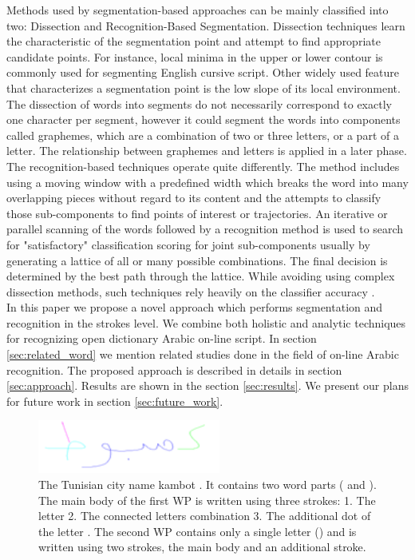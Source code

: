 \documentclass[journal,compsoc]{IEEEtran}
\begin{document}
Methods used by segmentation-based approaches can be mainly classified into two: Dissection and Recognition-Based Segmentation. Dissection techniques learn the characteristic of the segmentation point and attempt to find appropriate candidate points. For instance, local minima in the upper or lower contour is commonly used for segmenting English cursive script. Other widely used feature that characterizes a segmentation point is the low slope of its local environment. The dissection of words into segments do not necessarily correspond to exactly one character per segment, however it could segment the words into components called graphemes, which are a combination of two or three letters, or a part of a letter. The relationship between graphemes and letters is applied in a later phase. The recognition-based techniques operate quite differently. The method includes using a moving window with a predefined width which breaks the word into many overlapping pieces without regard to its content and the attempts to classify those sub-components to find points of interest or trajectories. An iterative or parallel scanning of the words followed by a recognition method is used to search for "satisfactory" classification scoring for joint sub-components usually by generating a lattice of all or many possible combinations. The final decision is determined by the best path through the lattice. While avoiding using complex dissection methods, such techniques rely heavily on the classifier accuracy \cite{casey1996survey}. \\

In this paper we propose a novel approach which performs segmentation and recognition in the strokes level. We combine both holistic and analytic techniques for recognizing open dictionary Arabic on-line script. In section \ref{sec:related_word} we mention related studies done in the field of on-line Arabic recognition. The proposed approach is described in details in section \ref{sec:approach}. Results are shown in the section \ref{sec:results}. We present our plans for future work in section \ref{sec:future_work}.

\begin{figure}
\centering
\includegraphics[width=6cm]{./figures/kmbot_color}       
\caption{The Tunisian city name kambot . It contains two word parts ( and ). The main body of the first WP is written using three strokes: 1. The letter  2. The connected letters combination  3. The additional dot of the letter . The second WP contains only a single letter () and is written using two strokes, the main body and an additional stroke.}
\label{fig:kmbot}
\end{figure}
\end{document}
